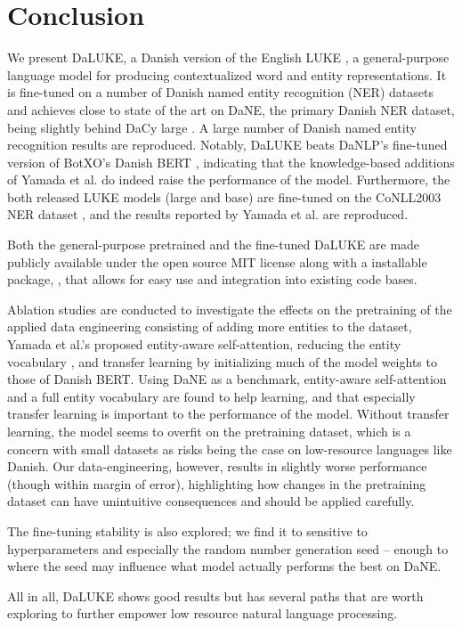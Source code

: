 \documentclass[main.tex]{subfiles}
\begin{document}
\chapter{Conclusion}
We present DaLUKE, a Danish version of the English LUKE \cite{yamada2020luke}, a general-purpose language model for producing contextualized word and entity representations.
It is fine-tuned on a number of Danish named entity recognition (NER) datasets and achieves close to state of the art on DaNE, the primary Danish NER dataset, being slightly behind DaCy large \cite{enevoldsen2020dacy}.
A large number of Danish named entity recognition results are reproduced.
Notably, DaLUKE beats DaNLP's fine-tuned version of BotXO's Danish BERT \cite{danlp2021, botxo2019dabert}, indicating that the knowledge-based additions of Yamada et al. \cite{yamada2020luke} do indeed raise the performance of the model.
Furthermore, the both released LUKE models (large and base) are fine-tuned on the CoNLL2003 NER dataset \cite{tjang2003conll}, and the results reported by Yamada et al. are reproduced.

Both the general-purpose pretrained and the fine-tuned DaLUKE are made publicly available under the open source MIT license \cite{mitlicense} along with a  installable package, , that allows for easy use and integration into existing code bases.

Ablation studies are conducted to investigate the effects on the pretraining of the applied data engineering consisting of adding more entities to the dataset, Yamada et al.'s proposed entity-aware self-attention, reducing the entity vocabulary \cite{yamada2020luke}, and transfer learning by initializing much of the model weights to those of Danish BERT.
Using DaNE as a benchmark, entity-aware self-attention and a full entity vocabulary are found to help learning, and that especially transfer learning is important to the performance of the model.
Without transfer learning, the model seems to overfit on the pretraining dataset, which is a concern with small datasets as risks being the case on low-resource languages like Danish.
Our data-engineering, however, results in slightly worse performance (though within margin of error), highlighting how changes in the pretraining dataset can have unintuitive consequences and should be applied carefully.

The fine-tuning stability is also explored; we find it to sensitive to hyperparameters and especially the random number generation seed -- enough to where the seed may influence what model actually performs the best on DaNE.

All in all, DaLUKE shows good results but has several paths that are worth exploring to further empower low resource natural language processing.
\end{document}
